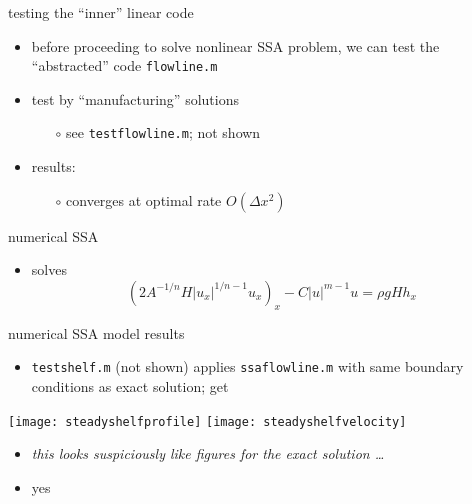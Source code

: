 \begin{frame}{testing the ``inner'' linear code}

\begin{itemize}
\item before proceeding to solve nonlinear SSA problem, we can test the ``abstracted'' code \texttt{flowline.m}
\item test by ``manufacturing'' solutions
  \begin{itemize}
  \item[$\circ$] see \texttt{testflowline.m}; not shown
  \end{itemize}
\item results:
  \begin{itemize}
  \item[$\circ$] converges at optimal rate $O(\Delta x^2)$
  \end{itemize}
\end{itemize}
\end{frame}


\begin{frame}{numerical SSA}


\vspace{-3mm}
\small
\begin{itemize}
\item solves
  $$\left(2 A^{-1/n} H |u_x|^{1/n - 1} u_x\right)_x - C|u|^{m-1}u = \rho g H h_x$$
\end{itemize}
\end{frame}


\begin{frame}{numerical SSA model results}

\begin{itemize}
\item \texttt{testshelf.m} (not shown) applies \texttt{ssaflowline.m} with same boundary conditions as exact solution; get
\end{itemize}

\begin{center}
  \texttt{[image: steadyshelfprofile]} \quad
  \texttt{[image: steadyshelfvelocity]}
\end{center}

\bigskip
\begin{itemize}
\item \emph{this looks suspiciously like figures for the exact solution \dots}
\item yes
\end{itemize}
\end{frame}


